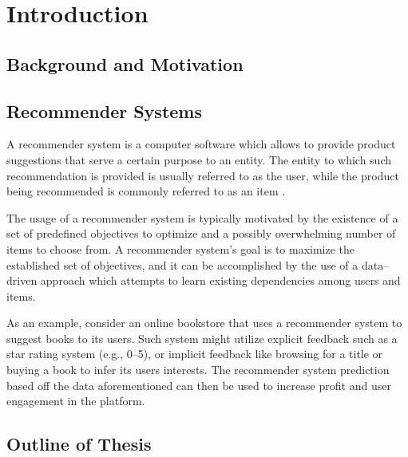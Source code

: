 \section{Introduction} \label{sect:intro}

\subsection{Background and Motivation} \label{subsect:intro:background}

\subsection{Recommender Systems} \label{subsect:intro:recommender-systems}

A recommender system is a computer software which allows to provide product suggestions that serve a certain purpose to an entity. The entity to which such recommendation is provided is usually referred to as the user, while the product being recommended is commonly referred to as an item \cite{book:rs}.

The usage of a recommender system is typically motivated by the existence of a set of predefined objectives to optimize and a possibly overwhelming number of items to choose from. A recommender system's goal is to maximize the established set of objectives, and it can be accomplished by the use of a data--driven approach which attempts to learn existing dependencies among users and items.

As an example, consider an online bookstore that uses a recommender system to suggest books to its users. Such system might utilize explicit feedback such as a star rating system (e.g., 0--5), or implicit feedback like browsing for a title or buying a book to infer its users interests. The recommender system prediction based off the data aforementioned can then be used to increase profit and user engagement in the platform.

\subsection{Outline of Thesis} \label{subsect:intro:outline}
